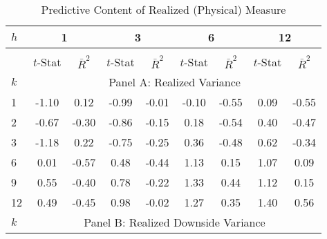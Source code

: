 \documentclass[11pt]{article}
\begin{document}
\clearpage
\newpage

\begin{table}
  \caption{Predictive Content of Realized (Physical) Measure}\label{TabRealizedVolRegressionResults}
  \begin{center}
  \begin{tabular}{lllllllll}
\hline
$h$ & \multicolumn{2}{c}{1} & \multicolumn{2}{c}{3} & \multicolumn{2}{c}{6} & \multicolumn{2}{c}{12} \\
\hline
 & \multicolumn{8}{c}{} \\
 & \multicolumn{1}{c}{$t$-Stat} & \multicolumn{1}{c}{$\bar{R}^2$} & \multicolumn{1}{c}{$t$-Stat} & \multicolumn{1}{c}{$\bar{R}^2$} & \multicolumn{1}{c}{$t$-Stat} & \multicolumn{1}{c}{$\bar{R}^2$} & \multicolumn{1}{c}{$t$-Stat} & \multicolumn{1}{c}{$\bar{R}^2$} \\
\hline
$k$ & \multicolumn{8}{c}{Panel A: Realized Variance} \\
\hline
1 & \multicolumn{1}{c}{-1.10} & \multicolumn{1}{c}{0.12} & \multicolumn{1}{c}{-0.99} & \multicolumn{1}{c}{-0.01} & \multicolumn{1}{c}{-0.10} & \multicolumn{1}{c}{-0.55} & \multicolumn{1}{c}{0.09} & \multicolumn{1}{c}{-0.55} \\
2 & \multicolumn{1}{c}{-0.67} & \multicolumn{1}{c}{-0.30} & \multicolumn{1}{c}{-0.86} & \multicolumn{1}{c}{-0.15} & \multicolumn{1}{c}{0.18} & \multicolumn{1}{c}{-0.54} & \multicolumn{1}{c}{0.40} & \multicolumn{1}{c}{-0.47} \\
3 & \multicolumn{1}{c}{-1.18} & \multicolumn{1}{c}{0.22} & \multicolumn{1}{c}{-0.75} & \multicolumn{1}{c}{-0.25} & \multicolumn{1}{c}{0.36} & \multicolumn{1}{c}{-0.48} & \multicolumn{1}{c}{0.62} & \multicolumn{1}{c}{-0.34} \\
6 & \multicolumn{1}{c}{0.01} & \multicolumn{1}{c}{-0.57} & \multicolumn{1}{c}{0.48} & \multicolumn{1}{c}{-0.44} & \multicolumn{1}{c}{1.13} & \multicolumn{1}{c}{0.15} & \multicolumn{1}{c}{1.07} & \multicolumn{1}{c}{0.09} \\
9 & \multicolumn{1}{c}{0.55} & \multicolumn{1}{c}{-0.40} & \multicolumn{1}{c}{0.78} & \multicolumn{1}{c}{-0.22} & \multicolumn{1}{c}{1.33} & \multicolumn{1}{c}{0.44} & \multicolumn{1}{c}{1.12} & \multicolumn{1}{c}{0.15} \\
12 & \multicolumn{1}{c}{0.49} & \multicolumn{1}{c}{-0.45} & \multicolumn{1}{c}{0.98} & \multicolumn{1}{c}{-0.02} & \multicolumn{1}{c}{1.27} & \multicolumn{1}{c}{0.35} & \multicolumn{1}{c}{1.40} & \multicolumn{1}{c}{0.56} \\
\hline
$k$ & \multicolumn{8}{c}{Panel B: Realized Downside Variance} \\

\end{tabular}
\end{center}
\end{table}
\end{document}

